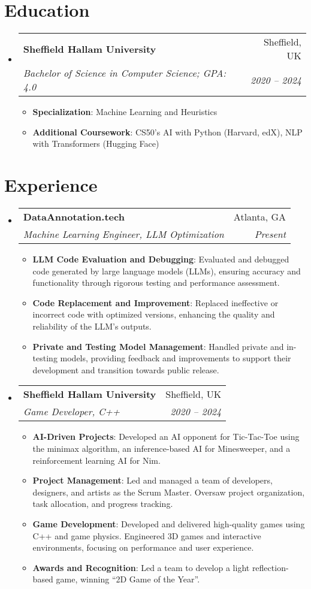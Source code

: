 \documentclass[letterpaper,11pt]{article}
\makeatletter
\newcommand{\resumeItem}[2]{
  \item\small{
    \textbf{#1}{: #2 \vspace{-2pt}}
  }
}
\newcommand{\resumeSubheading}[4]{
  \vspace{-1pt}\item
    \begin{tabular*}{0.97\textwidth}{l@{\extracolsep{\fill}}r}
      \textbf{#1} & #2 \\
      \textit{\small#3} & \textit{\small #4} \\
    \end{tabular*}\vspace{-5pt}
}
\newcommand{\resumeSubHeadingListStart}{\begin{itemize}[leftmargin=*, itemsep=0pt]}
\newcommand{\resumeSubHeadingListEnd}{\end{itemize}}
\newcommand{\resumeItemListStart}{\begin{itemize}[itemsep=0pt]}
\newcommand{\resumeItemListEnd}{\end{itemize}\vspace{-5pt}}
\makeatother
\begin{document}
\section{Education}
 \resumeSubHeadingListStart
    \resumeSubheading
      {Sheffield Hallam University}{Sheffield, UK}
      {Bachelor of Science in Computer Science; GPA: 4.0}{2020 -- 2024}
      \resumeItemListStart
        \resumeItem{Specialization}
          {Machine Learning and Heuristics}
        \resumeItem{Additional Coursework}
          {CS50's AI with Python (Harvard, edX), NLP with Transformers (Hugging Face)}
      \resumeItemListEnd
  \resumeSubHeadingListEnd
\vspace{-0.5cm} %



\section{Experience}
 \resumeSubHeadingListStart
    \resumeSubheading
      {DataAnnotation.tech}{Atlanta, GA}
      {Machine Learning Engineer, LLM Optimization}{Present}
      \resumeItemListStart
        \resumeItem{LLM Code Evaluation and Debugging}
          {Evaluated and debugged code generated by large language models (LLMs), ensuring accuracy and functionality through rigorous testing and performance assessment.}
        \resumeItem{Code Replacement and Improvement}
          {Replaced ineffective or incorrect code with optimized versions, enhancing the quality and reliability of the LLM’s outputs.}
        \resumeItem{Private and Testing Model Management}
          {Handled private and in-testing models, providing feedback and improvements to support their development and transition towards public release.}
      \resumeItemListEnd


    \resumeSubheading
      {Sheffield Hallam University}{Sheffield, UK}
      {Game Developer, C++}{2020 -- 2024}
      \resumeItemListStart
        \resumeItem{AI-Driven Projects}
          {Developed an AI opponent for Tic-Tac-Toe using the minimax algorithm, an inference-based AI for Minesweeper, and a reinforcement learning AI for Nim.}
        \resumeItem{Project Management}
          {Led and managed a team of developers, designers, and artists as the Scrum Master. Oversaw project organization, task allocation, and progress tracking.}
        \resumeItem{Game Development}
          {Developed and delivered high-quality games using C++ and game physics. Engineered 3D games and interactive environments, focusing on performance and user experience.}
        \resumeItem{Awards and Recognition}
          {Led a team to develop a light reflection-based game, winning “2D Game of the Year”.}
      \resumeItemListEnd
  \resumeSubHeadingListEnd
\vspace{-1cm} %
\end{document}
